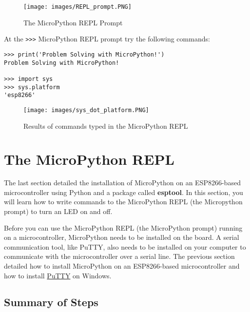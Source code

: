 \documentclass{book}
\makeatletter
\def\maxwidth{\ifdim\Gin@nat@width>\linewidth\linewidth
\else\Gin@nat@width\fi}
\let\Oldincludegraphics\includegraphics
\renewcommand{\includegraphics}[1]{\Oldincludegraphics[width=.8\maxwidth]{#1}}
\newcommand{\passthrough}[1]{#1}
\makeatother
\begin{document}
\begin{figure}
\centering
\texttt{[image: images/REPL\_prompt.PNG]}
\caption{The MicroPython REPL Prompt}
\end{figure}

At the \passthrough{\lstinline!>>>!} MicroPython REPL prompt try the
following commands:

\begin{lstlisting}
>>> print('Problem Solving with MicroPython!')
Problem Solving with MicroPython!

>>> import sys
>>> sys.platform
'esp8266'
\end{lstlisting}

\begin{figure}
\centering
\texttt{[image: images/sys\_dot\_platform.PNG]}
\caption{Results of commands typed in the MicroPython REPL}
\end{figure}
    




    
        \hypertarget{the-micropython-repl}{%
\section{The MicroPython REPL}\label{the-micropython-repl}}
    




    
        The last section detailed the installation of MicroPython on an
ESP8266-based microcontroller using Python and a package called
\textbf{esptool}. In this section, you will learn how to write commands
to the MicroPython REPL (the Micropython prompt) to turn an LED on and
off.

Before you can use the MicroPython REPL (the MicroPython prompt) running
on a microcontroller, MicroPython needs to be installed on the board. A
serial communication tool, like PuTTY, also needs to be installed on
your computer to communicate with the microcontroller over a serial
line. The previous section detailed how to install MicroPython on an
ESP8266-based microcontroller and how to install
\href{https://www.putty.org/}{PuTTY} on Windows.
    




    
        \hypertarget{summary-of-steps}{%
\subsection{Summary of Steps}\label{summary-of-steps}}
    
\end{document}
